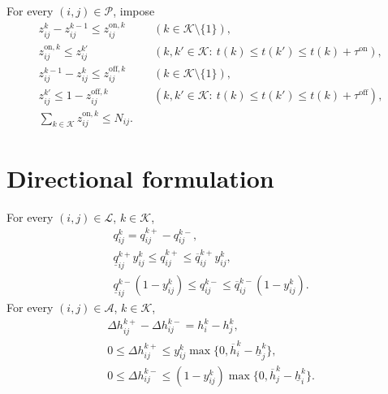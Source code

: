 \documentclass{article}
\begin{document}
For every $(i,j)\in\mathcal P$, impose
\begin{align}
z_{ij}^k-z_{ij}^{k-1}\le z_{ij}^{\mathrm{on},k}
&\quad(k\in\mathcal K\setminus\{1\}), \tag{13b}\\
z_{ij}^{\mathrm{on},k}\le z_{ij}^{k'}
&\quad(k,k'\in\mathcal K:\ t(k)\le t(k')\le t(k)+\tau^{\mathrm{on}}), \tag{13c}\\
z_{ij}^{k-1}-z_{ij}^k\le z_{ij}^{\mathrm{off},k}
&\quad(k\in\mathcal K\setminus\{1\}), \tag{13d}\\
z_{ij}^{k'}\le1-z_{ij}^{\mathrm{off},k}
&\quad(k,k'\in\mathcal K:\ t(k)\le t(k')\le t(k)+\tau^{\mathrm{off}}), \tag{13e}\\
\sum_{k\in\mathcal K}z_{ij}^{\mathrm{on},k}\le N_{ij}. & \tag{13f}
\end{align}

\section*{Directional formulation}
For every $(i,j)\in\mathcal L$, $k\in\mathcal K$,
\begin{align}
q_{ij}^k=q_{ij}^{k+}-q_{ij}^{k-}, \tag{15}\\
\underline q_{ij}^{k+}y_{ij}^k\le q_{ij}^{k+}\le\overline q_{ij}^{k+}y_{ij}^k, \tag{16b}\\
\underline q_{ij}^{k-}(1-y_{ij}^k)\le q_{ij}^{k-}\le\overline q_{ij}^{k-}(1-y_{ij}^k). \tag{16c}
\end{align}
For every $(i,j)\in\mathcal A$, $k\in\mathcal K$,
\begin{align}
\Delta h_{ij}^{k+}-\Delta h_{ij}^{k-}=h_i^k-h_j^k, \tag{17a}\\
0\le\Delta h_{ij}^{k+}\le y_{ij}^k\max\{0,\overline h_i^k-\underline h_j^k\}, \tag{17b}\\
0\le\Delta h_{ij}^{k-}\le(1-y_{ij}^k)\max\{0,\overline h_j^k-\underline h_i^k\}. \tag{17c}
\end{align}
\end{document}
